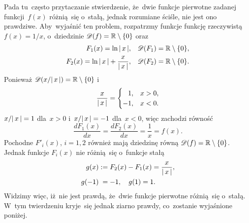 \documentclass[a4paper,11pt]{article}
\begin{document}
\newpage


\vspace{0em}



\vspace{0em}


\noindent
{} Pada tu~często przytaczanie stwierdzenie, że~dwie
funkcje pierwotne zadanej funkcji~$f( x )$ różnią~się o~stałą, jednak
rozumiane ściśle, nie jest ono prawdziwe. Aby~wyjaśnić ten problem,
rozpatrzmy funkcje funkcję rzeczywistą $f( x ) = 1 / x$, o~dziedzinie
$\mathcal{D}( f ) = \mathbb{R} \setminus \{ 0 \}$ oraz
\begin{subequations}
  \begin{align}
    \label{eq:FichtenholzVolII-01-A}
    F_{ 1 }( x ) = \ln|\, {  x  } \,|, \quad
    & \mathcal{D}( F_{ 1 } ) = \mathbb{R} \setminus \{ 0 \}, \\
    \label{eq:FichtenholzVolII-01-B}
    F_{ 2 }( x ) = \ln|\, {  x  } \,| + \frac{ x }{ |\, {  x  } \,| }, \quad
    & \mathcal{D}( F_{ 2 } ) = \mathbb{R} \setminus \{ 0 \}.
  \end{align}
\end{subequations}
Ponieważ $\mathcal{D}( x / |\, {  x  } \,| ) = \mathbb{R} \setminus \{ 0 \}$ i
\begin{equation}
  \label{eq:FichtenholzVolII-02}
  \frac{ x }{ |\, {  x  } \,| } =
  \begin{cases}
    \hphantom{-}1, & x > 0, \\
    -1, & x < 0.
  \end{cases}
\end{equation}
$x / |\, {  x  } \,| = 1$ dla~$x > 0$ i~$x / |\, {  x  } \,| = -1$
dla~$x < 0$, więc zachodzi równość
\begin{equation}
  \label{eq:FichtenholzVolII-03}
  \frac{ d F_{ 1 }( x ) }{ dx } = \frac{ d F_{ 2 }( x ) }{ dx }
  = \frac{ 1 }{ x } = f( x ).
\end{equation}
Pochodne $F'_{ i }( x )$, $i = 1, 2$ również mają dziedzinę równą
$\mathcal{D}( f ) = \mathbb{R} \setminus \{ 0 \}$. Jednak funkcje $F_{ i }( x )$
nie różnią~się o~funkcje stałą
\begin{subequations}
  \begin{align}
    \label{eq:FichtenholzVolII-04-A}
    g( x ) &:= F_{ 2 }( x ) - F_{ 1 }( x ) = \frac{ x }{ |\, {  x  } \,| }, \\
    \label{eq:FichtenholzVolII-04-B}
    g( -1 ) &\hphantom{:}= -1, \quad g( 1 ) = 1.
  \end{align}
\end{subequations}
Widzimy więc, iż~nie jest prawdą, że~dwie funkcje pierwotne różnią~się
o~stałą. W~tym twierdzeniu kryje~się jednak ziarno prawdy, co~zostanie
wyjaśnione poniżej.
\end{document}
